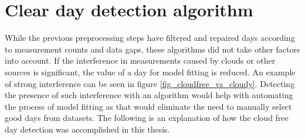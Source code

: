








\section{Clear day detection algorithm}
\label{clearskyalgo_chapter}
While the previous preprocessing steps have filtered and repaired days according to measurement counts and data gaps, these algorithms did not take other factors into account. If the interference in measurements caused by clouds or other sources is significant, the value of a day for model fitting is reduced. An example of strong interference can be seen in figure \ref{fig_cloudfree_vs_cloudy}. Detecting the presence of such interference with an algorithm would help with automating the process of model fitting as that would eliminate the need to manually select good days from datasets. The following is an explanation of how the cloud free day detection was accomplished in this thesis.




